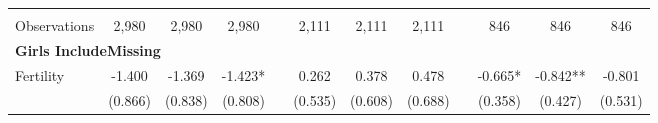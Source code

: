 \begin{landscape}
\begin{table}[htpb!]
\begin{center}
\begin{tabular}{lcccp{2mm}cccp{2mm}ccc}
\begin{footnotesize}\end{footnotesize}&\begin{footnotesize}\end{footnotesize}&\begin{footnotesize}\end{footnotesize}&\begin{footnotesize}\end{footnotesize}&\begin{footnotesize}\end{footnotesize}&\begin{footnotesize}\end{footnotesize}&\begin{footnotesize}\end{footnotesize}&\begin{footnotesize}\end{footnotesize}&\begin{footnotesize}\end{footnotesize}&\begin{footnotesize}\end{footnotesize}&\begin{footnotesize}\end{footnotesize}&\begin{footnotesize}\end{footnotesize}\\Observations&2,980&2,980&2,980&&2,111&2,111&2,111&&846&846&846\\
\multicolumn{12}{l}{\textbf{Girls IncludeMissing}}\\ 
Fertility&-1.400&-1.369&-1.423*&&0.262&0.378&0.478&&-0.665*&-0.842**&-0.801\\
&(0.866)&(0.838)&(0.808)&&(0.535)&(0.608)&(0.688)&&(0.358)&(0.427)&(0.531)\\

\end{tabular}
\end{center}
\end{table}
\end{landscape}
